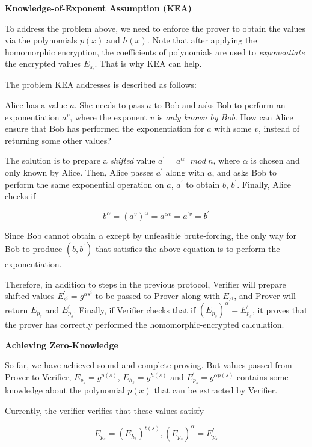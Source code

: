 \documentclass[
]{report}
\begin{document}
\textbf{Knowledge-of-Exponent Assumption (KEA)}

To address the problem above, we need to enforce the prover to obtain
the values via the polynomials \(p(x)\) and \(h(x)\). Note that after
applying the homomorphic encryption, the coefficients of polynomials are
used to \emph{exponentiate} the encrypted values \(E_{s_{i}}\). That is
why KEA can help.

The problem KEA addresses is described as follows:

Alice has a value \(a\). She needs to pass \(a\) to Bob and asks Bob to
perform an exponentiation \(a^{v}\), where the exponent \(v\) is
\emph{only known by Bob}. How can Alice ensure that Bob has performed
the exponentiation for \(a\) with some \(v\), instead of returning some
other values?

The solution is to prepare a \emph{shifted} value
\(a^{'} = a^{\alpha}\ \ \ mod\ n\), where \(\alpha\) is chosen and only
known by Alice. Then, Alice passes \(a^{'}\) along with \(a\), and asks
Bob to perform the same exponential operation on \(a\), \(a^{'}\) to
obtain \(b\), \(b^{'}\). Finally, Alice checks if

\[b^{\alpha} = \left( a^{v} \right)^{\alpha} = a^{\alpha v} = a^{'v} = b^{'}\]

Since Bob cannot obtain \(\alpha\) except by unfeasible brute-forcing,
the only way for Bob to produce \(\left( b,b^{'} \right)\) that
satisfies the above equation is to perform the exponentiation.

Therefore, in addition to steps in the previous protocol, Verifier will
prepare shifted values \(E_{s^{i}}^{'} = g^{\alpha s^{i}}\) to be passed
to Prover along with \(E_{s^{i}}\), and Prover will return \(E_{p_{s}}\)
and \(E_{p_{s}}^{'}\). Finally, if Verifier checks that if
\(\left( E_{p_{s}} \right)^{\alpha} = E_{p_{s}}^{'}\), it proves that
the prover has correctly performed the homomorphic-encrypted
calculation.

\textbf{Achieving Zero-Knowledge}

So far, we have achieved sound and complete proving. But values passed
from Prover to Verifier, \(E_{p_{s}} = g^{p(s)}\),
\(E_{h_{s}} = g^{h(s)}\) and \(E_{p_{s}}^{'} = g^{\alpha p(s)}\)
contains some knowledge about the polynomial \(p(x)\) that can be
extracted by Verifier.

Currently, the verifier verifies that these values satisfy

\[E_{p_{s}} = \left( E_{h_{s}} \right)^{t(s)},\left( E_{p_{s}} \right)^{\alpha} = E_{p_{s}}^{'}\]
\end{document}
